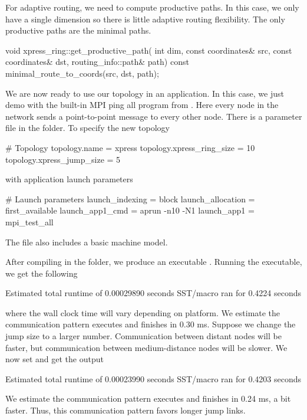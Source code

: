 For adaptive routing, we need to compute productive paths.
In this case, we only have a single dimension so there is little adaptive routing flexibility.
The only productive paths are the minimal paths.

\begin{CppCode}
void
xpress_ring::get_productive_path(
  int dim,
  const coordinates& src,
  const coordinates& dst,
  routing_info::path& path) const
{
  minimal_route_to_coords(src, dst, path);
}
\end{CppCode}

We are now ready to use our topology in an application.
In this case, we just demo with the built-in MPI ping all program from \sstmacro.
Here every node in the network sends a point-to-point message to every other node.
There is a parameter file in the  folder.
To specify the new topology

\begin{ViFile}
# Topology
topology.name = xpress
topology.xpress_ring_size = 10
topology.xpress_jump_size = 5
\end{ViFile}
with application launch parameters

\begin{ViFile}
# Launch parameters
launch_indexing = block
launch_allocation = first_available
launch_app1_cmd = aprun -n10 -N1
launch_app1 = mpi_test_all
\end{ViFile}
The file also includes a basic machine model.

After compiling in the folder, we produce an executable .
Running the executable, we get the following

\begin{ShellCmd}
Estimated total runtime of           0.00029890 seconds
SST/macro ran for       0.4224 seconds
\end{ShellCmd}
where the \sstmacro wall clock time will vary depending on platform.
We estimate the communication pattern executes and finishes in 0.30 ms.
Suppose we change the jump size to a larger number.
Communication between distant nodes will be faster, but communication between medium-distance nodes will be slower.
We now set  and get the output

\begin{ShellCmd}
Estimated total runtime of           0.00023990 seconds
SST/macro ran for       0.4203 seconds
\end{ShellCmd}
We estimate the communication pattern executes and finishes in 0.24 ms, a bit faster.
Thus, this communication pattern favors longer jump links.


